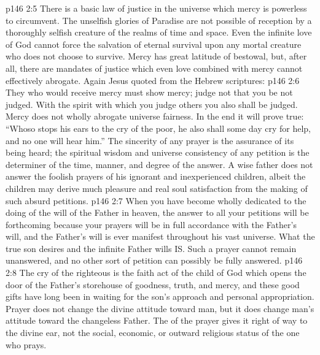 \vs p146 2:5 \bibnobreakspace There is a basic law of justice in the universe which mercy is powerless to circumvent. The unselfish glories of Paradise are not possible of reception by a thoroughly selfish creature of the realms of time and space. Even the infinite love of God cannot force the salvation of eternal survival upon any mortal creature who does not choose to survive. Mercy has great latitude of bestowal, but, after all, there are mandates of justice which even love combined with mercy cannot effectively abrogate. Again Jesus quoted from the Hebrew scriptures: 
\vs p146 2:6 \bibnobreakspace They who would receive mercy must show mercy; judge not that you be not judged. With the spirit with which you judge others you also shall be judged. Mercy does not wholly abrogate universe fairness. In the end it will prove true: “Whoso stops his ears to the cry of the poor, he also shall some day cry for help, and no one will hear him.” The sincerity of any prayer is the assurance of its being heard; the spiritual wisdom and universe consistency of any petition is the determiner of the time, manner, and degree of the answer. A wise father does not  answer the foolish prayers of his ignorant and inexperienced children, albeit the children may derive much pleasure and real soul satisfaction from the making of such absurd petitions.
\vs p146 2:7 \bibnobreakspace When you have become wholly dedicated to the doing of the will of the Father in heaven, the answer to all your petitions will be forthcoming because your prayers will be in full accordance with the Father’s will, and the Father’s will is ever manifest throughout his vast universe. What the true son desires and the infinite Father wills IS. Such a prayer cannot remain unanswered, and no other sort of petition can possibly be fully answered.
\vs p146 2:8 \bibnobreakspace The cry of the righteous is the faith act of the child of God which opens the door of the Father’s storehouse of goodness, truth, and mercy, and these good gifts have long been in waiting for the son’s approach and personal appropriation. Prayer does not change the divine attitude toward man, but it does change man’s attitude toward the changeless Father. The  of the prayer gives it right of way to the divine ear, not the social, economic, or outward religious status of the one who prays.
